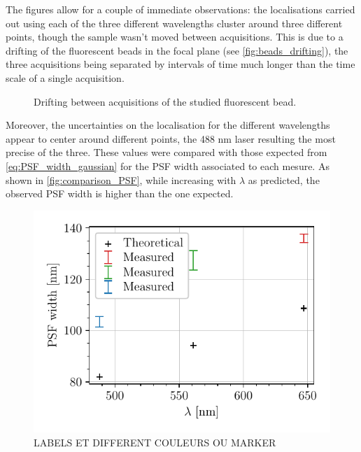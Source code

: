 The figures allow for a couple of immediate observations:
the localisations carried out using each of the three different wavelengths cluster around three different points, though the sample wasn't moved between acquisitions.
This is due to a drifting of the fluorescent beads in the focal plane (see \autoref{fig:beads_drifting}), the three acquisitions being separated by intervals of time much longer than the time scale of a single acquisition.
\begin{figure}
    \centering
    \caption{Drifting between acquisitions of the studied fluorescent bead.}
    \label{fig:beads_drifting}
\end{figure}
Moreover, the uncertainties on the localisation for the different wavelengths appear to center around different points, the 488 nm laser resulting the most precise of the three.
These values were compared with those expected from \autoref{eq:PSF_width_gaussian} for the PSF width associated to each mesure.
As shown in \autoref{fig:comparison_PSF}, while increasing with $\lambda$ as predicted,
the observed PSF width is higher than the one expected.

\begin{figure}[htbp]
    \centering
    \includegraphics[scale=1]{figures/comparison_PSF.pdf}
    \caption{LABELS ET DIFFERENT COULEURS OU MARKER}
    \label{fig:comparison_PSF}
\end{figure}

